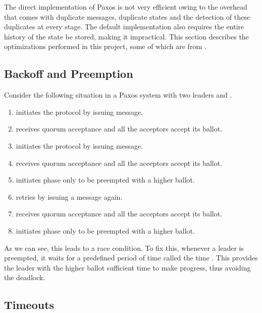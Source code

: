 The direct implementation of Paxos is not very efficient owing to the overhead
that comes with duplicate messages, duplicate states and the detection of these
duplicates at every stage. The default implementation also requires the
entire history of the
state be stored, making it impractical. This section describes the optimizations
performed in this project, some of which are from \citet{Robbert2011}.

\subsection{Backoff and Preemption}

Consider the following situation in a Paxos system with two leaders 
and .

\begin{enumerate}
  \item {} initiates the protocol by issuing  message.
  \item {} receives quorum acceptance and all the acceptors accept its
    ballot.
  \item {} initiates the protocol by issuing  message.
  \item {} receives quorum acceptance and all the acceptors accept its
    ballot.
  \item {} initiates  phase only to be preempted with a higher
    ballot.
  \item {} retries by issuing a  message again.
  \item {} receives quorum acceptance and all the acceptors accept its
    ballot.
  \item {} initiates  phase only to be preempted with a higher
    ballot.
\end{enumerate}

As we can see, this leads to a race condition. To
fix this, whenever a leader is preempted, it waits for a predefined period of
time called the  time%
. This provides the leader with the higher
ballot sufficient time to make progress, thus avoiding the deadlock.

\subsection{Timeouts}

